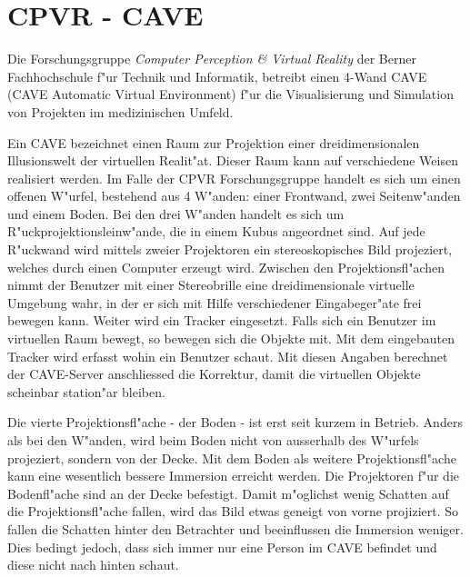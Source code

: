 
\section{CPVR - CAVE}
Die Forschungsgruppe \textit{Computer Perception \& Virtual Reality} der Berner Fachhochschule f"ur Technik und Informatik, betreibt einen 4-Wand CAVE (CAVE Automatic Virtual Environment) f"ur die Visualisierung und Simulation von Projekten im medizinischen Umfeld.

Ein CAVE bezeichnet einen Raum zur Projektion einer dreidimensionalen Illusionswelt der virtuellen Realit"at. Dieser Raum kann auf verschiedene Weisen realisiert werden. Im Falle der CPVR Forschungsgruppe handelt es sich um einen offenen W"urfel, bestehend aus 4 W"anden: einer Frontwand, zwei Seitenw"anden und einem Boden. Bei den drei W"anden handelt es sich um R"uckprojektionsleinw"ande, die in einem Kubus angeordnet sind. Auf jede R"uckwand wird mittels zweier Projektoren ein stereoskopisches Bild projeziert, welches durch einen Computer erzeugt wird. Zwischen den Projektionsfl"achen nimmt der Benutzer mit einer Stereobrille eine dreidimensionale virtuelle Umgebung wahr, in der er sich mit Hilfe verschiedener Eingabeger"ate frei bewegen kann. Weiter wird ein Tracker eingesetzt. Falls sich ein Benutzer im virtuellen Raum bewegt, so bewegen sich die Objekte mit. Mit dem eingebauten Tracker wird erfasst wohin ein Benutzer schaut. Mit diesen Angaben berechnet der CAVE-Server anschliessed die Korrektur, damit die virtuellen Objekte scheinbar station"ar bleiben.

Die vierte Projektionsfl"ache - der Boden - ist erst seit kurzem in Betrieb. Anders als bei den W"anden, wird beim Boden nicht von ausserhalb des W"urfels projeziert, sondern von der Decke. Mit dem Boden als weitere Projektionsfl"ache kann eine wesentlich bessere Immersion erreicht werden.
Die Projektoren f"ur die Bodenfl"ache sind an der Decke befestigt. Damit m"oglichst wenig Schatten auf die Projektionsfl"ache fallen, wird das Bild etwas geneigt von vorne projiziert. So fallen die Schatten hinter den Betrachter und beeinflussen die Immersion weniger. Dies bedingt jedoch, dass sich immer nur eine Person im CAVE befindet und diese nicht nach hinten schaut.

